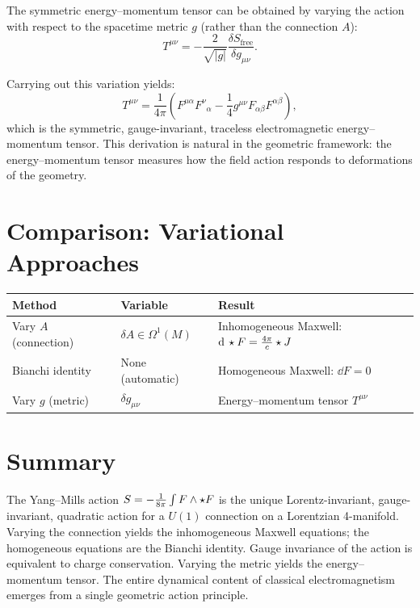 The symmetric energy--momentum tensor can be obtained by varying the action with respect to the spacetime metric $g$ (rather than the connection $A$):
\begin{equation}
T^{\mu\nu} = -\frac{2}{\sqrt{|g|}}\frac{\delta S_{\text{free}}}{\delta g_{\mu\nu}}.
\end{equation}

Carrying out this variation yields:
\begin{equation}
\boxed{T^{\mu\nu} = \frac{1}{4\pi}\!\left(F^{\mu\alpha}F^{\nu}{}_\alpha - \frac{1}{4}g^{\mu\nu}F_{\alpha\beta}F^{\alpha\beta}\right),}
\end{equation}
which is the symmetric, gauge-invariant, traceless electromagnetic energy--momentum tensor. This derivation is natural in the geometric framework: the energy--momentum tensor measures how the field action responds to deformations of the geometry.

\section{Comparison: Variational Approaches}

\begin{table}[h]
\centering
\renewcommand{\arraystretch}{1.5}
\begin{tabular}{lll}
\toprule
\textbf{Method} & \textbf{Variable} & \textbf{Result} \\
\midrule
Vary $A$ (connection) & $\delta A \in \Omega^1(M)$ & Inhomogeneous Maxwell: $\mathrm{d}\,\star F = \frac{4\pi}{c}\star J$ \\
Bianchi identity & None (automatic) & Homogeneous Maxwell: $\dd F = 0$ \\
Vary $g$ (metric) & $\delta g_{\mu\nu}$ & Energy--momentum tensor $T^{\mu\nu}$ \\
\bottomrule
\end{tabular}
\end{table}

\section{Summary}

The Yang--Mills action $S = -\frac{1}{8\pi}\int F \wedge \star F$ is the unique Lorentz-invariant, gauge-invariant, quadratic action for a $U(1)$ connection on a Lorentzian 4-manifold. Varying the connection yields the inhomogeneous Maxwell equations; the homogeneous equations are the Bianchi identity. Gauge invariance of the action is equivalent to charge conservation. Varying the metric yields the energy--momentum tensor. The entire dynamical content of classical electromagnetism emerges from a single geometric action principle.
